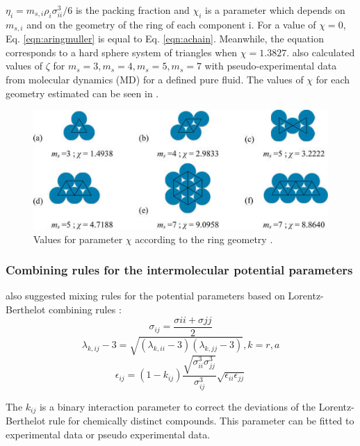 $\eta_{i}=m_{s,i}\rho_{i}\sigma_{ii}^{3}/6$ is the packing fraction and $\chi_{i}$ is a parameter which depends on $m_{s,i}$ and on the geometry of the ring of each component i. For a value of $\chi=0$, Eq. \eqref{eqn:aringmuller} is equal to Eq. \eqref{eqn:achain}. Meanwhile, the equation corresponds to a hard sphere system of triangles when $\chi=1.3827$.  also calculated values of $\zeta$ for $m_{s}=3,m_{s}=4,m_{s}=5,m_{s}=7$ with pseudo-experimental data from molecular dynamics (MD) for a defined pure fluid. The values of $\chi$ for each geometry estimated can be seen in .
\begin{figure}[th]
	\centering
	\includegraphics[scale=0.9]{Figures/mullergeo.jpg}
	\caption{Values for parameter $\chi$ according to the ring geometry \cite{muller2017}.}
	\label{ringqsi}
\end{figure}

\subsubsection{Combining rules for the intermolecular potential parameters}
 also suggested mixing rules for the potential parameters based on Lorentz-Berthelot combining rules \cite{rowlinson}:
\begin{equation}
\sigma_{ij} =\frac{\sigma{ii}+\sigma{jj}}{2}
\label{eqn:sigmamix}
\end{equation}
\begin{equation}
\lambda_{k,ij} -3 =\sqrt{(\lambda_{k,ii}-3)(\lambda_{k,jj}-3)} , k=r,a
\label{eqn:lambdamix}
\end{equation}
\begin{equation}
\epsilon_{ij} =(1-k_{ij})\frac{\sqrt{\sigma_{ii}^{3}\sigma_{jj}^{3}}}{\sigma_{ij}^{3}}\sqrt{\epsilon_{ii}\epsilon_{jj}}
\label{eqn:epsmix}
\end{equation}

The $k_{ij}$ is a binary interaction parameter to correct the deviations of the Lorentz-Berthelot rule for chemically distinct compounds. This parameter can be fitted to experimental data or pseudo experimental data.


